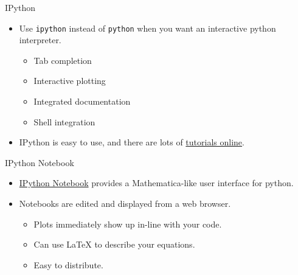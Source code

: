 \begin{frame}{IPython}

 \begin{itemize}

  \item Use \texttt{ipython} instead of \texttt{python} when you want an 
   interactive python interpreter.

  \begin{itemize}
   \item Tab completion
   \item Interactive plotting
   \item Integrated documentation
   \item Shell integration
  \end{itemize}

  \item IPython is easy to use, and there are lots of 
   \href{http://ipython.org/ipython-doc/2/interactive/tutorial.html}{tutorials 
   online}.

 \end{itemize}

\end{frame}

\begin{frame}{IPython Notebook}


 \begin{itemize}

  \item 
   \href{http://ipython.org/ipython-doc/stable/notebook/index.html}{IPython 
   Notebook} provides a Mathematica-like user interface for python.

  \item Notebooks are edited and displayed from a web browser.

  \begin{itemize}
   \item Plots immediately show up in-line with your code.
   \item Can use LaTeX to describe your equations.
   \item Easy to distribute.
  \end{itemize}

 \end{itemize}

\end{frame}
